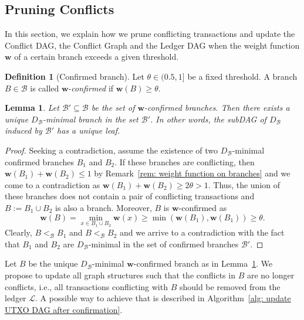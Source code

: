 \documentclass[11pt]{article}
\newcommand{\AW}{\mathbf{w}}
\newcommand{\branchset}{\mathcal{B}}
\newcommand{\ledger}{\mathcal{L}}
\newcommand{\BranchDAG}{D_{\branchset}}
\theoremstyle{plain}
\newtheorem{lemma}{Lemma}
\theoremstyle{definition}
\newtheorem{definition}{Definition}
\numberwithin{definition}{section}
\numberwithin{lemma}{section}
\numberwithin{ass}{section}
\numberwithin{remark}{section}
\numberwithin{example}{section}
\numberwithin{proposition}{section}
\numberwithin{theorem}{section}
\begin{document}
\subsection{Pruning Conflicts}\label{sec:ConflictPruning}
In this section, we explain how we prune conflicting transactions and update the Conflict DAG, the Conflict Graph and the Ledger DAG when the weight function $\AW$ of a certain branch exceeds a given threshold.

\begin{definition}[Confirmed branch]
Let $\theta \in (0.5, 1]$ be a fixed threshold. A branch ${B}\in\branchset$ is called $\AW$-\textit{confirmed} if 
$\AW({B})\ge\theta$. 
\end{definition}

\begin{lemma}\label{lem: the only minimal confirmed branch}
Let $\branchset'\subseteq\branchset$ be the set of $\AW$-confirmed branches. Then there exists a unique $\BranchDAG$-minimal branch in the set $\branchset'$. In other words, the subDAG of $\BranchDAG$ induced by $\branchset'$ has  a unique leaf.
\end{lemma}

\begin{proof}
Seeking a contradiction, assume the existence of two $\BranchDAG$-minimal confirmed branches ${B}_1$ and ${B}_2$. If these branches are conflicting, then $\AW({B}_1)+\AW({B}_2)\le 1$ by Remark~\ref{rem: weight function on branches} and we come to a contradiction as $\AW({B}_1)+\AW({B}_2)\ge2\theta>1$.  Thus, the union of these branches does not contain a pair of conflicting transactions and ${B}:={B}_1\cup {B}_2$ is also a branch. Moreover,  ${B}$ is $\AW$-confirmed as
$$
\AW({B})=\min_{x\in{B}_1\cup{B}_2} \AW(x)\ge \min(\AW({B}_1),\AW({B}_1))\ge \theta.
$$
Clearly, ${B}<_{\branchset}{B}_1$ and  ${B}<_{{\branchset}}{B}_2$ and we arrive to a contradiction with the fact that ${B}_1$ and ${B}_2$ are $\BranchDAG$-minimal in the set of confirmed branches $\branchset'$.
\end{proof}
Let  ${B}$ be the unique $\BranchDAG$-minimal  $\AW$-confirmed branch as in Lemma~\ref{lem: the only minimal confirmed branch}. We propose to update all graph structures such that the conflicts in $B$ are no longer conflicts, i.e., all transactions conflicting with $B$ should be removed from the ledger $\ledger$. A possible way to achieve that is described in Algorithm~\ref{alg: update UTXO DAG after confirmation}.
\end{document}
